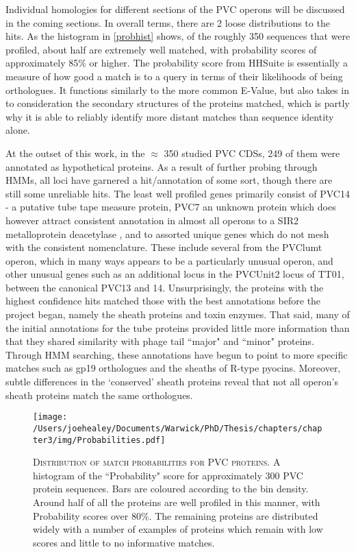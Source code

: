 Individual homologies for different sections of the PVC operons will be discussed in the coming sections. In overall terms, there are 2 loose distributions to the hits. As the histogram in \vref{probhist} shows, of the roughly 350 sequences that were profiled, about half are extremely well matched, with probability scores of approximately 85\% or higher. The probability score from HHSuite is essentially a measure of how good a match is to a query in terms of their likelihoods of being orthologues. It functions similarly to the more common E-Value, but also takes in to consideration the secondary structures of the proteins matched, which is partly why it is able to reliably identify more distant matches than sequence identity alone.

At the outset of this work, in the $\approx$ 350 studied PVC CDSs, 249 of them were annotated as hypothetical proteins. As a result of further probing through HMMs, all loci have garnered a hit/annotation of some sort, though there are still some unreliable hits. The least well profiled genes primarily consist of PVC14 - a putative tube tape measure protein, PVC7 an unknown protein which does however attract consistent annotation in almost all operons to a SIR2 metalloprotein deacetylase \citep{Shore2000}, and to assorted unique genes which do not mesh with the consistent nomenclature. These include several from the PVClumt operon, which in many ways appears to be a particularly unusual operon, and other unusual genes such as an additional locus in the PVCUnit2 locus of \Plum{} TT01, between the canonical PVC13 and 14. Unsurprisingly, the proteins with the highest confidence hits matched those with the best annotations before the project began, namely the sheath proteins and toxin enzymes. That said, many of the initial annotations for the tube proteins provided little more information than that they shared similarity with phage tail ``major" and ``minor" proteins. Through HMM searching, these annotations have begun to point to more specific matches such as gp19 orthologues and the sheaths of R-type pyocins. Moreover, subtle differences in the `conserved' sheath proteins reveal that not all operon's sheath proteins match the same orthologues.


\begin{figure}[h]
\centering
\texttt{[image: /Users/joehealey/Documents/Warwick/PhD/Thesis/chapters/chapter3/img/Probabilities.pdf]}
	\captionsetup{singlelinecheck=off, justification=justified, font=footnotesize, aboveskip=10pt}
	\caption[HHPred orthologue match scores]{\textsc{\normalsize Distribution of match probabilities for PVC proteins.}\vspace{0.1cm} \newline A histogram of the ``Probability" score for approximately 300 PVC protein sequences. Bars are coloured according to the bin density. Around half of all the proteins are well profiled in this manner, with Probability scores over 80\%. The remaining proteins are distributed widely with a number of examples of proteins which remain with low scores and little to no informative matches.}
	\label{probhist}
\end{figure}


